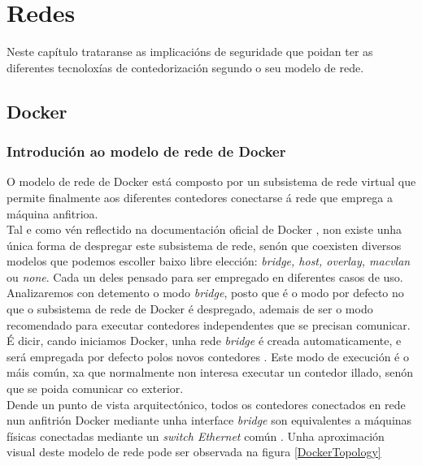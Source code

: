 \chapter{Redes}
\minitoc
\clearpage

Neste capítulo trataranse as implicacións de seguridade que poidan ter as diferentes tecnoloxías de contedorización segundo o seu modelo de rede.

\section{Docker}

\subsection{Introdución ao modelo de rede de Docker}

O modelo de rede de Docker está composto por un subsistema de rede virtual que permite finalmente aos diferentes contedores conectarse á rede que emprega a máquina anfitrioa.\\

Tal e como vén reflectido na documentación oficial de Docker \cite{docker-networking}, non existe unha única forma de despregar este subsistema de rede, senón que coexisten diversos modelos que podemos escoller baixo libre elección: \textit{bridge, host, overlay, macvlan} ou \textit{none}. Cada un deles pensado para ser empregado en diferentes casos de uso.\\

Analizaremos con detemento o modo \textit{bridge}, posto que é o modo por defecto no que o subsistema de rede de Docker é despregado, ademais de ser o modo recomendado para executar contedores independentes que se precisan comunicar. É dicir, cando iniciamos Docker, unha rede \textit{bridge} é creada automaticamente, e será empregada por defecto polos novos contedores \cite{docker-bridge-networks}. Este modo de execución é o máis común, xa que normalmente non interesa executar un contedor illado, senón que se poida comunicar co exterior.\\

Dende un punto de vista arquitectónico, todos os contedores conectados en rede nun anfitrión Docker mediante unha interface \textit{bridge} son equivalentes a máquinas físicas conectadas mediante un \textit{switch Ethernet} común \cite{docker-security}. Unha aproximación visual deste modelo de rede pode ser observada na figura \ref{DockerTopology}\\

